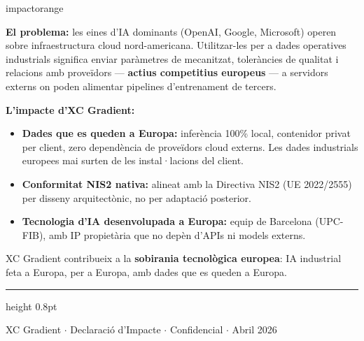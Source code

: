 \documentclass[11pt,a4paper]{article}
\begin{document}
\begin{impactcard}{impactorange}

\textbf{El problema:} les eines d'IA dominants (OpenAI, Google, Microsoft) operen sobre infraestructura cloud nord-americana. Utilitzar-les per a dades operatives industrials significa enviar paràmetres de mecanitzat, toleràncies de qualitat i relacions amb proveïdors --- \textbf{actius competitius europeus} --- a servidors externs on poden alimentar pipelines d'entrenament de tercers.

\textbf{L'impacte d'XC Gradient:}

\begin{itemize}[leftmargin=1em,itemsep=1pt,topsep=2pt]
\item \textbf{Dades que es queden a Europa:} inferència 100\% local, contenidor privat per client, zero dependència de proveïdors cloud externs. Les dades industrials europees mai surten de les instal·lacions del client.
\item \textbf{Conformitat NIS2 nativa:} alineat amb la Directiva NIS2 (UE 2022/2555) per disseny arquitectònic, no per adaptació posterior.
\item \textbf{Tecnologia d'IA desenvolupada a Europa:} equip de Barcelona (UPC-FIB), amb IP propietària que no depèn d'APIs ni models externs.
\end{itemize}

\begin{center}
\colorbox{softyellow}{\parbox{0.9\linewidth}{\centering\small
XC Gradient contribueix a la \textbf{sobirania tecnològica europea}: IA industrial feta a Europa, per a Europa, amb dades que es queden a Europa.
}}
\end{center}
\end{impactcard}

\vspace{0.6em}

{\color{accent}\hrule height 0.8pt}
\vspace{0.4em}

\begin{center}
\end{center}

\vspace{0.3em}
\begin{center}
\small\textcolor{midgray}{XC Gradient $\cdot$ Declaració d'Impacte $\cdot$ Confidencial $\cdot$ Abril 2026}
\end{center}
\end{document}

